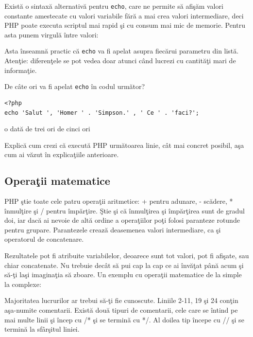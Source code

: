 Există o sintaxă alternativă pentru \texttt{echo}, care ne permite
să afişăm valori constante amestecate cu valori variabile fără
a mai crea valori intermediare, deci PHP poate executa
scriptul mai rapid şi cu consum mai mic de memorie.
Pentru asta punem virgulă între valori:


Asta înseamnă practic că \texttt{echo} va fi apelat asupra fiecărui
parametru din listă. Atenţie: diferenţele se pot vedea
doar atunci când lucrezi cu cantităţi mari de informaţie.

\begin{Exercise}[difficulty=1,title={Sintaxa alternativă pentru echo}]
De câte ori va fi apelat \texttt{echo} în codul următor? %
\begin{lstlisting}
<?php
echo 'Salut ', 'Homer ' . 'Simpson.' , ' Ce ' . 'faci?';
\end{lstlisting}
\Question o dată
\Question de trei ori
\Question de cinci ori
\end{Exercise}

\begin{Exercise}[difficulty=2,title={Determinarea fluxului de execuţie într-un exemplu simplu}]
Explică cum crezi că execută PHP următoarea linie, cât mai concret posibil, aşa cum
ai văzut în explicaţiile anterioare.

\end{Exercise}

\subsection{Operaţii matematice}

PHP ştie toate cele patru operaţii aritmetice: + pentru adunare,
- scădere, * înmulţire şi / pentru împărţire. Ştie şi că
înmulţirea şi împărţirea sunt de gradul doi, iar dacă ai nevoie
de altă ordine a operaţiilor poţi folosi paranteze rotunde pentru
grupare. Parantezele crează deasemenea valori intermediare, ca
şi operatorul de concatenare.

Rezultatele pot fi atribuite variabilelor, deoarece sunt tot
valori, pot fi afişate, sau chiar concatenate. Nu trebuie decât
să pui cap la cap ce ai învăţat până acum şi să-ţi laşi imaginaţia
să zboare.
Un exemplu cu operaţii matematice de la simple la complexe:


Majoritatea lucrurilor ar trebui să-ţi fie cunoscute. Liniile
2-11, 19 şi 24 conţin aşa-numite comentarii. Există două
tipuri de comentarii, cele care se întind pe mai multe linii
şi încep cu {\glqq}/*{\grqq} şi se termină cu {\glqq}*/{\grqq}. Al doilea tip
începe cu {\glqq}//{\grqq} şi se termină la sfârşitul liniei.

